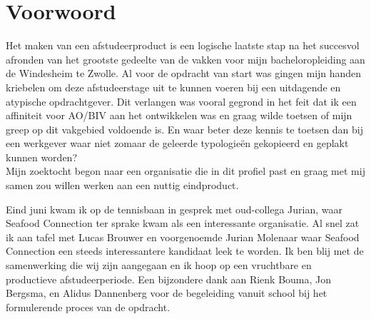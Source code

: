 \documentclass[10pt,a4paper,twoside]{report}
\begin{document}
\chapter*{Voorwoord}
\thispagestyle{empty}
\BgThispage
Het maken van een afstudeerproduct is een logische laatste stap na het succesvol afronden van het grootste gedeelte van de vakken voor mijn bacheloropleiding aan de Windesheim te Zwolle. Al voor de opdracht van start was gingen mijn handen kriebelen om deze afstudeerstage uit te kunnen voeren bij een uitdagende en atypische opdrachtgever. Dit verlangen was vooral gegrond in het feit dat ik een affiniteit voor AO/BIV aan het ontwikkelen was en graag wilde toetsen of mijn greep op dit vakgebied voldoende is. En waar beter deze kennis te toetsen dan bij een werkgever waar niet zomaar de geleerde typologieën gekopieerd en geplakt kunnen worden? \\
Mijn zoektocht begon naar een organisatie die in dit profiel past en graag met mij samen zou willen werken aan een nuttig eindproduct.

Eind juni kwam ik op de tennisbaan in gesprek met oud-collega Jurian, waar Seafood Connection ter sprake kwam als een interessante organisatie. Al snel zat ik aan tafel met Lucas Brouwer en voorgenoemde Jurian Molenaar waar Seafood Connection een steeds interessantere kandidaat leek te worden. Ik ben blij met de samenwerking die wij zijn aangegaan en ik hoop op een vruchtbare en productieve afstudeerperiode. Een bijzondere dank aan Rienk Bouma, Jon Bergsma, en Alidus Dannenberg voor de begeleiding vanuit school bij het formulerende proces van de opdracht. 
\end{document}
